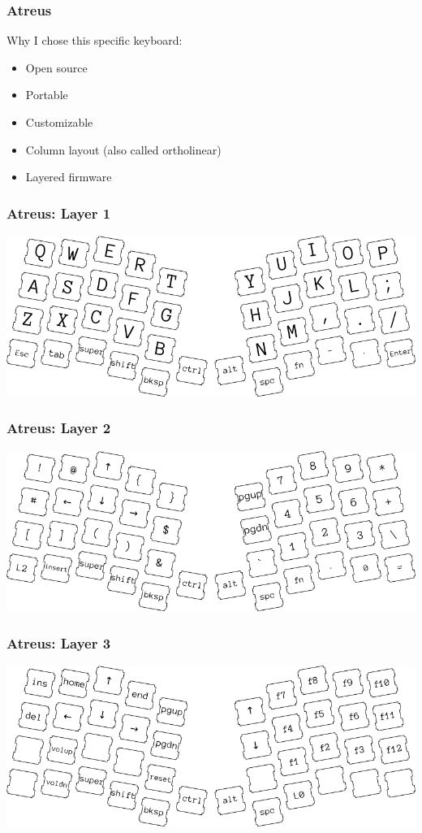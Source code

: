 \documentclass{beamer}
\begin{document}
\begin{frame}
  \frametitle{Atreus}
  Why I chose this specific keyboard:
  \begin{itemize}
    \item Open source
    \item Portable
    \item Customizable
    \item Column layout (also called ortholinear)
    \item Layered firmware
  \end{itemize}
\end{frame}




\begin{frame}
  \frametitle{Atreus: Layer 1}
  \includegraphics[scale=0.45]{images/atreus-layer-1}
\end{frame}

\begin{frame}
  \frametitle{Atreus: Layer 2}
  \includegraphics[scale=0.45]{images/atreus-layer-2}
\end{frame}

\begin{frame}
  \frametitle{Atreus: Layer 3}
  \includegraphics[scale=0.45]{images/atreus-layer-3}
\end{frame}
\end{document}
